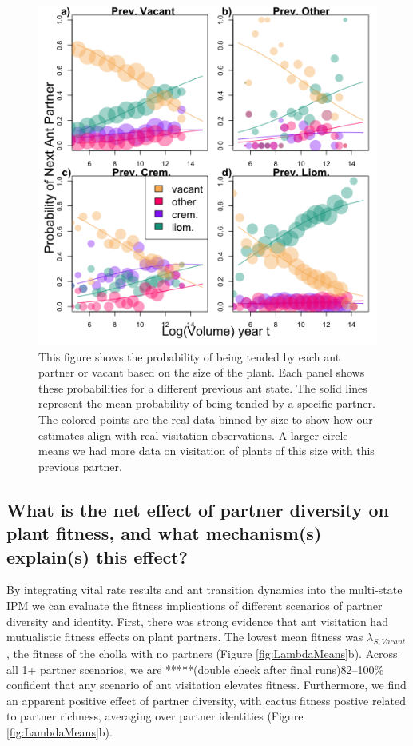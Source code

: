 \documentclass[11pt]{article}
\begin{document}
\begin{figure}[H]
	\includegraphics[width=0.95\linewidth]{Figures/transition.png}
	\caption{This figure shows the probability of being tended by each ant partner or vacant based on the size of the plant. Each panel shows these probabilities for a different previous ant state. The solid lines represent the mean probability of being tended by a specific partner. The colored points are the real data binned by size to show how our estimates align with real visitation observations. A larger circle means we had more data on visitation of plants of this size with this previous partner.}
	\label{fig:Ant_Transition}
\end{figure}

\subsection*{What is the net effect of partner diversity on plant fitness, and what mechanism(s) explain(s) this effect?}
By integrating vital rate results and ant transition dynamics into the multi-state IPM we can evaluate the fitness implications of different scenarios of partner diversity and identity. 
First, there was strong evidence that ant visitation had mutualistic fitness effects on plant partners. 
The lowest mean fitness was $\lambda_{S,Vacant}$, the fitness of the cholla with no partners (Figure \ref{fig:LambdaMeans}b).
Across all 1+ partner scenarios, we are *****(double check after final runs)82--100\% confident that any scenario of ant visitation elevates fitness. 
Furthermore, we find an apparent positive effect of partner diversity, with cactus fitness postive related to partner richness, averaging over partner identities (Figure \ref{fig:LambdaMeans}b).
\end{document}
